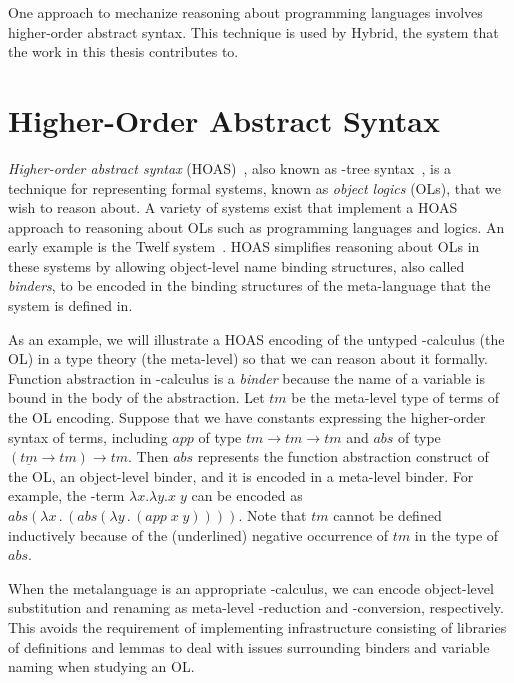 One approach to mechanize reasoning about programming languages involves higher-order abstract syntax. This technique is used by Hybrid, the system that the work in this thesis contributes to.


\section{Higher-Order Abstract Syntax}
\label{sec:introhoas}

\emph{Higher-order abstract syntax} (HOAS)~\cite{PE:PLDI88}, also known as \lambda-tree syntax~\cite{MillerP99}, is a technique for representing formal systems, known as \emph{object logics} (OLs), that we wish to reason about. A variety of systems exist that implement a HOAS approach to reasoning about OLs such as programming languages and logics. An early example is the Twelf system~\cite{TwelfSP}. HOAS simplifies reasoning about OLs in these systems by allowing object-level name binding structures, also called \emph{binders}, to be encoded in the binding structures of the meta-language that the system is defined in.

As an example, we will illustrate a HOAS encoding of the untyped \lambda-calculus (the OL) in a type theory (the meta-level) so that we can reason about it formally. Function abstraction in \lambda-calculus is a \emph{binder} because the name of a variable is bound in the body of the abstraction. Let $\mathit{tm}$ be the meta-level type of terms of the OL encoding. Suppose that we have constants expressing the higher-order syntax of terms, including $\mathit{app}$ of type $\mathit{tm} \rightarrow \mathit{tm} \rightarrow \mathit{tm}$ and $\mathit{abs}$ of type $(\underline{\mathit{tm}} \rightarrow \mathit{tm}) \rightarrow \mathit{tm}$. Then $\mathit{abs}$ represents the function abstraction construct of the OL, an object-level binder, and it is encoded in a meta-level binder. For example, the \lambda-term $\lambda x . \lambda y . x \; y$ can be encoded as $\mathit{abs} (\lambda x \, . \, (\mathit{abs} (\lambda y \, . \, (\mathit{app} \; x \; y))))$. Note that $\mathit{tm}$ cannot be defined inductively because of the (underlined) negative occurrence of $\mathit{tm}$ in the type of $\mathit{abs}$.

When the metalanguage is an appropriate \lambda-calculus, we can encode object-level substitution and renaming as meta-level \beta-reduction and \alpha-conversion, respectively. This avoids the requirement of implementing infrastructure consisting of libraries of definitions and lemmas to deal with issues surrounding binders and variable naming when studying an OL.

